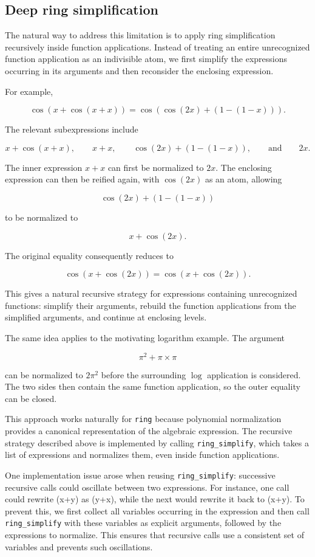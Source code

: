 \documentclass{jflart}
\begin{document}
\subsection{Deep ring simplification}\label{sec:deep-ring}

The natural way to address this limitation is to apply ring simplification recursively inside function applications. Instead of treating an entire unrecognized function application as an indivisible atom, we first simplify the expressions occurring in its arguments and then reconsider the enclosing expression.

For example,

$$
  \cos(x+\cos(x+x))
  =
  \cos(\cos(2x)+(1-(1-x))).
$$

The relevant subexpressions include

$$
  x+\cos(x+x),\qquad
  x+x,\qquad
  \cos(2x)+(1-(1-x)),
  \qquad\text{and}\qquad
  2x.
$$

The inner expression $x+x$ can first be normalized to $2x$. The enclosing expression can then be reified again, with $\cos(2x)$ as an atom, allowing

$$
  \cos(2x)+(1-(1-x))
$$

to be normalized to

$$
  x+\cos(2x).
$$

The original equality consequently reduces to

$$
  \cos(x+\cos(2x))
  =
  \cos(x+\cos(2x)).
$$

This gives a natural recursive strategy for expressions containing unrecognized
functions: simplify their arguments, rebuild the function applications from
the simplified arguments, and continue at enclosing levels.

The same idea applies to the motivating logarithm example. The argument

$$
  \pi^2+\pi\mathbin{\times}\pi
$$

can be normalized to $2\pi^2$ before the surrounding $\log$ application is considered. The two sides then contain the same function application, so the outer equality can be closed.

This approach works naturally for \texttt{ring} because polynomial normalization provides a canonical representation of the algebraic expression. 
The recursive strategy described above is implemented by calling
\texttt{ring\_simplify}, which takes a list of expressions and
normalizes them, even inside function applications.


One implementation issue arose when reusing \texttt{ring\_simplify}: successive recursive calls could oscillate between two expressions. For instance, one call could rewrite (x+y) as (y+x), while the next would rewrite it back to (x+y). To prevent this, we first collect all variables occurring in the expression and then call \texttt{ring\_simplify} with these variables as explicit arguments, followed by the expressions to normalize. This ensures that recursive calls use a consistent set of variables and prevents such oscillations. 
\end{document}
